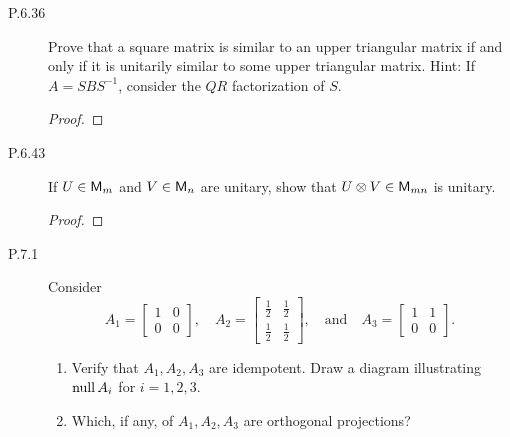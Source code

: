 \documentclass{../homework}
\begin{document}
\begin{description}
\item[P.6.36] Prove that a square matrix is similar to an upper
  triangular matrix if and only if it is unitarily similar to some
  upper triangular matrix.  Hint: If \(A = SBS^{-1}\), consider the
  \(QR\) factorization of \(S\).

  \begin{solution}
    \begin{proof}

    \end{proof}
  \end{solution}

\item[P.6.43] If \(U \in \mathsf{M}_m\) and \(V \in \mathsf{M}_n\) are unitary, show
  that \(U \otimes V \in \mathsf{M}_{mn}\) is unitary.

  \begin{solution}
    \begin{proof}

    \end{proof}
  \end{solution}

\item[P.7.1] Consider
  \[
    A_1 =
    \begin{bmatrix}
      1 & 0 \\
      0 & 0
    \end{bmatrix},
    \quad
    A_2 =
    \begin{bmatrix}
      \frac 1 2 & \frac 1 2 \\
      \frac 1 2 & \frac 1 2
    \end{bmatrix},
    \quad \text{and} \quad
    A_3 =
    \begin{bmatrix}
      1 & 1 \\
      0 & 0
    \end{bmatrix}.
  \]
  \begin{enumerate}
  \item Verify that \(A_1, A_2, A_3\) are idempotent.  Draw a diagram
    illustrating \(\operatorname{null} A_i\) for \(i = 1, 2, 3\).

    \begin{solution}

    \end{solution}

  \item
    \label{part:which-orthogonal-projections}
    Which, if any, of \(A_1, A_2, A_3\) are orthogonal
    projections?

    \begin{solution}


\end{solution}
\end{enumerate}
\end{description}
\end{document}
